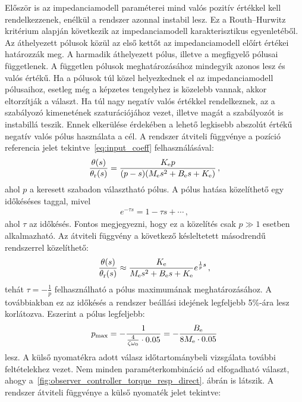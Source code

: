 Először is az impedanciamodell paraméterei mind valós pozitív értékkel kell rendelkezzenek, enélkül a rendszer 
azonnal instabil lesz. Ez a Routh--Hurwitz kritérium alapján következik az impedanciamodell karakterisztikus egyenletéből.
Az áthelyezett pólusok közül az első kettőt az impedanciamodell előírt értékei határozzák meg. 
A harmadik áthelyezett pólus, illetve a megfigyelő pólusai függetlenek. A független pólusok meghatározásához 
mindegyik azonos lesz és valós értékű. Ha a pólusok túl közel helyezkednek el az impedanciamodell pólusaihoz,
esetleg még a képzetes tengelyhez is közelebb vannak, akkor eltorzítják a választ. Ha túl nagy negatív valós
értékkel rendelkeznek, az a szabályozó kimenetének szaturációjához vezet, illetve magát a szabályozót is
instabillá teszik. Ennek elkerülése érdekében a lehető legkisebb abszolút értékű negatív valós pólus használata a cél. 
A rendszer átviteli függvénye a pozíció referencia jelet tekintve~\eqref{eq:input_coeff} felhasználásával:
\begin{align}
    \frac{\theta(s)}{\theta_{\mathrm{r}} (s)} = \frac{K_{\mathrm{e}} p}{(p-s)(M_{\mathrm{e}} s^2 + B_{\mathrm{e}} s + K_{\mathrm{e}})}\,,
\end{align}
ahol \(p\) a keresett szabadon választható pólus. A pólus hatása közelíthető egy időkéséses taggal, mivel
\begin{align}
    e^{-\tau s} = 1 - \tau s + \cdots\,,
\end{align}
ahol \(\tau\) az időkésés. Fontos megjegyezni, hogy ez a közelítés csak \(p \gg 1\) esetben alkalmazható. 
Az átviteli függvény a következő késleltetett másodrendű rendszerrel közelíthető:
\begin{align}
    \frac{\theta(s)}{\theta_{\mathrm{r}} (s)} \approx \frac{K_{\mathrm{e}}}{M_{\mathrm{e}} s^2 + B_{\mathrm{e}} s + K_{\mathrm{e}}}e^{\frac{1}{p}s}\,,
\end{align}
tehát \(\tau = -\frac{1}{p}\) felhasználható a pólus maximumának meghatározásához. A továbbiakban 
ez az időkésés a rendszer beállási idejének legfeljebb 5\%-ára lesz korlátozva. Eszerint a pólus legfeljebb:
\begin{align}\label{eq:pole_selection_pos}
    p_{\mathrm{max}} = -\frac{1}{\frac{4}{\zeta \omega_0} \cdot 0.05} = -\frac{B_{\mathrm{e}}}{8M_{\mathrm{e}} \cdot 0.05}
\end{align}
lesz. A külső nyomatékra adott válasz időtartománybeli vizsgálata további feltételekhez vezet. 
Nem minden paraméterkombináció ad elfogadható választ, ahogy a~\ref{fig:observer_controller_torque_resp_direct}.
ábrán is látszik. A rendszer átviteli függvénye a külső nyomaték jelet tekintve:
